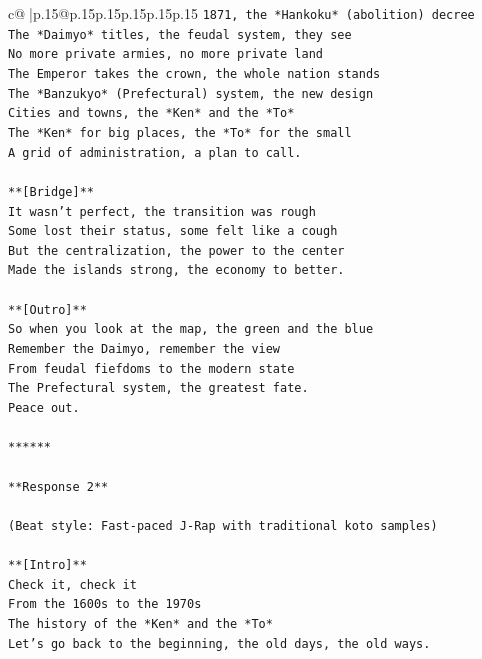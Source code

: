 \documentclass{article}
\begin{document}
{\begin{supertabular}{c@{$\;$}|p{.15\linewidth}@{}p{.15\linewidth}p{.15\linewidth}p{.15\linewidth}p{.15\linewidth}p{.15\linewidth}}
{{{\texttt{1871, the *Hankoku* (abolition) decree} \\
\texttt{The *Daimyo* titles, the feudal system, they see} \\
\texttt{No more private armies, no more private land} \\
\texttt{The Emperor takes the crown, the whole nation stands} \\
\texttt{The *Banzukyo* (Prefectural) system, the new design} \\
\texttt{Cities and towns, the *Ken* and the *To*} \\
\texttt{The *Ken* for big places, the *To* for the small} \\
\texttt{A grid of administration, a plan to call.} \\
\\ 
\texttt{**{[}Bridge{]}**} \\
\texttt{It wasn't perfect, the transition was rough} \\
\texttt{Some lost their status, some felt like a cough} \\
\texttt{But the centralization, the power to the center} \\
\texttt{Made the islands strong, the economy to better.} \\
\\ 
\texttt{**{[}Outro{]}**} \\
\texttt{So when you look at the map, the green and the blue} \\
\texttt{Remember the Daimyo, remember the view} \\
\texttt{From feudal fiefdoms to the modern state} \\
\texttt{The Prefectural system, the greatest fate.} \\
\texttt{Peace out.} \\
\\ 
\texttt{******} \\
\\ 
\texttt{**Response 2**} \\
\\ 
\texttt{(Beat style: Fast{-}paced J{-}Rap with traditional koto samples)} \\
\\ 
\texttt{**{[}Intro{]}**} \\
\texttt{Check it, check it} \\
\texttt{From the 1600s to the 1970s} \\
\texttt{The history of the *Ken* and the *To*} \\
\texttt{Let's go back to the beginning, the old days, the old ways.} \\
}}}
\end{supertabular}}
\end{document}
